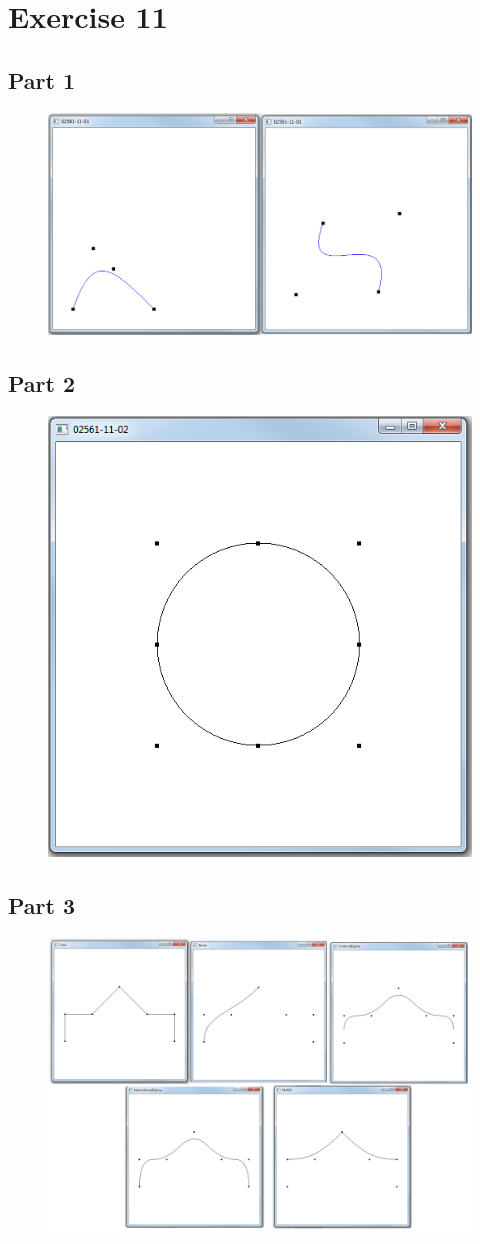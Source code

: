 \documentclass[11pt]{article}
\begin{document}
\section{Exercise 11}
\subsection{Part 1}
\begin{figure}[H]
	\centering
	\includegraphics[width=0.5\linewidth]{images/e11p1}
	\label{fig:e11p1}
\end{figure}

\subsection{Part 2}
\begin{figure}[H]
	\centering
	\includegraphics[width=0.5\linewidth]{images/e11p2}
	\label{fig:e11p2}
\end{figure}

\subsection{Part 3}
\begin{figure}[H]
	\centering
	\includegraphics[width=0.5\linewidth]{images/e11p3}
	\label{fig:e11p3}
\end{figure}
\end{document}
